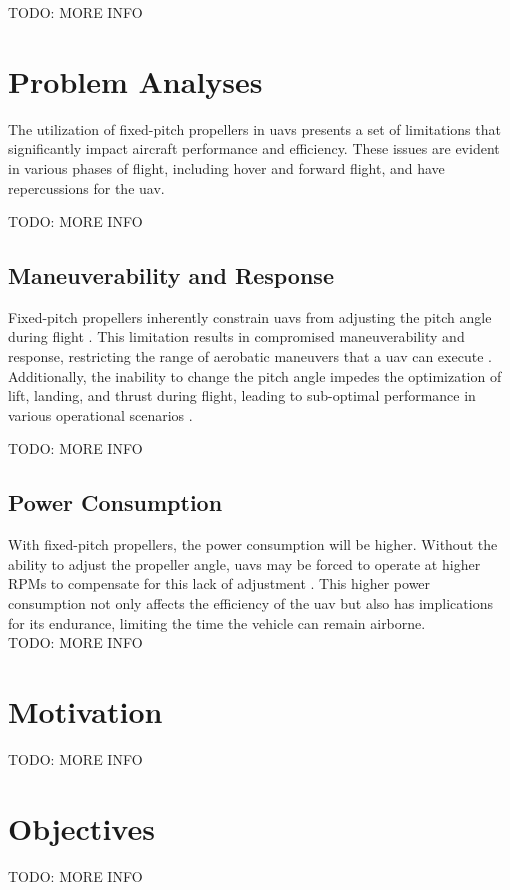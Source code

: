 TODO: MORE INFO



\section{Problem Analyses}
The utilization of fixed-pitch propellers in \glspl{uav} presents a set of limitations that significantly impact aircraft performance and efficiency.
These issues are evident in various phases of flight, including hover and forward flight, and have repercussions for the \gls{uav}.

TODO: MORE INFO\\

\subsection{Maneuverability and Response}
Fixed-pitch propellers inherently constrain \glspl{uav} from adjusting the pitch angle during flight \cite{FPP1}.
This limitation results in compromised maneuverability and response, restricting the range of aerobatic maneuvers that a \gls{uav} can execute \cite{FPP1}.
Additionally, the inability to change the pitch angle impedes the optimization of lift, landing, and thrust during flight, leading to sub-optimal performance in various operational scenarios \cite{FPP1}.

TODO: MORE INFO\\

\subsection{Power Consumption}
With fixed-pitch propellers, the power consumption will be higher.
Without the ability to adjust the propeller angle, \glspl{uav} may be forced to operate at higher \gls{RPM}s to compensate for this lack of adjustment \cite{FPP1}.
This higher power consumption not only affects the efficiency of the \gls{uav} but also has implications for its endurance, limiting the time the vehicle can remain airborne.\\

TODO: MORE INFO\\

\section{Motivation}
TODO: MORE INFO\\

\section{Objectives}
TODO: MORE INFO\\

